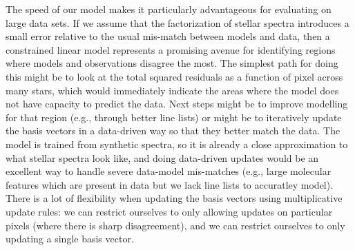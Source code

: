 \documentclass[modern]{aastex631}
\begin{document}
The speed of our model makes it particularly advantageous for evaluating on large data sets. If we assume that the factorization of stellar spectra introduces a small error relative to the usual mis-match between models and data, then a constrained linear model represents a promising avenue for identifying regions where models and observations disagree the most. The simplest path for doing this might be to look at the total squared residuals as a function of pixel across many stars, which would immediately indicate the areas where the model does not have capacity to predict the data. Next steps might be to improve modelling for that region (e.g., through better line lists) or might be to iteratively update the basis vectors in a data-driven way so that they better match the data. The model is trained from synthetic spectra, so it is already a close approximation to what stellar spectra look like, and doing data-driven updates would be an excellent way to handle severe data-model mis-matches (e.g., large molecular features which are present in data but we lack line lists to accuratley model). There is a lot of flexibility when updating the basis vectors using multiplicative update rules: we can restrict ourselves to only allowing updates on particular pixels (where there is sharp disagreement), and we can restrict ourselves to only updating a single basis vector.\\

\end{document}
